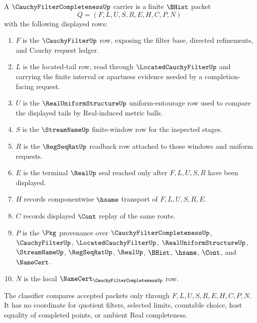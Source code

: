 \begin{definition}
\label{def:cauchy-filter-completeness-carrier}
A $\CauchyFilterCompletenessUp$ carrier is a finite $\BHist$ packet
$$
Q=(F,L,U,S,R,E,H,C,P,N)
$$
with the following displayed rows:
\begin{enumerate}
\item $F$ is the $\CauchyFilterUp$ row, exposing the filter base, directed refinements, and Cauchy request ledger.
\item $L$ is the located-tail row, read through $\LocatedCauchyFilterUp$ and carrying the finite interval or apartness evidence needed by a completion-facing request.
\item $U$ is the $\RealUniformStructureUp$ uniform-entourage row used to compare the displayed tails by Real-induced metric balls.
\item $S$ is the $\StreamNameUp$ finite-window row for the inspected stages.
\item $R$ is the $\RegSeqRatUp$ readback row attached to those windows and uniform requests.
\item $E$ is the terminal $\RealUp$ seal reached only after $F,L,U,S,R$ have been displayed.
\item $H$ records componentwise $\hsame$ transport of $F,L,U,S,R,E$.
\item $C$ records displayed $\Cont$ replay of the same route.
\item $P$ is the $\Pkg$ provenance over $\CauchyFilterCompletenessUp$, $\CauchyFilterUp$, $\LocatedCauchyFilterUp$, $\RealUniformStructureUp$, $\StreamNameUp$, $\RegSeqRatUp$, $\RealUp$, $\BHist$, $\hsame$, $\Cont$, and $\NameCert$.
\item $N$ is the local $\NameCert_{\CauchyFilterCompletenessUp}$ row.
\end{enumerate}
The classifier compares accepted packets only through $F,L,U,S,R,E,H,C,P,N$. It has no coordinate for quotient filters, selected limits, countable choice, host equality of completed points, or ambient Real completeness.
\end{definition}

